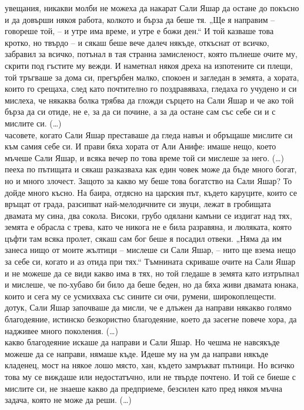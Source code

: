 \documentclass[12pt,a4paper]{article}
\begin{document}
 увещания, никакви молби не можеха да накарат Сали Яшар да остане до покъсно и да довърши някоя работа, колкото и бърза да беше тя. „Ще я направим – говореше
той, – и утре има време, и утре е божи ден.“ И той казваше това кротко, но твърдо – и сякаш
беше вече далеч някъде, откъснат от всичко, забравил за всичко, потънал в тая странна
замисленост, която пълнеше очите му, скрити под гъстите му вежди. И наметнал някоя дреха
на изпотените си плещи, той тръгваше за дома си, прегърбен малко, спокоен и загледан в
земята, а хората, които го срещаха, след като почтително го поздравяваха, гледаха го
учудено и си мислеха, че някаква болка трябва да гложди сърцето на Сали Яшар и че ако той
бърза да си отиде, не е, за да си почине, а за да остане сам със себе си и с мислите си. (…)\\
 часовете, когато Сали Яшар преставаше да гледа навън и обръщаше мислите си
към самия себе си. И прави бяха хората от Али Анифе: имаше нещо, което мъчеше Сали
Яшар, и всяка вечер по това време той си мислеше за него. (…)\\
 пееха по пътищата и сякаш разказваха как един човек може да бъде много
богат, но и много злочест. Защото за какво му беше това богатство на Сали Яшар? То дойде
много късно. На баира, отдясно на царския път, където каруците, които се връщат от града,
разсипват най-мелодичните си звуци, лежат в гробищата двамата му сина, два сокола.
Високи, грубо одялани камъни се издигат над тях, земята е обрасла с трева, като че никога не
е била разравяна, и люляката, която цъфти там всяка пролет, сякаш сам бог беше я посадил
отвеки. „Няма да им занеса нищо от моите жълтици – мислеше си Сали Яшар, – нито ще
взема нещо за себе си, когато и аз отида при тях.“ Тъмнината скриваше очите на Сали Яшар
и не можеше да се види какво има в тях, но той гледаше в земята като изтръпнал и мислеше,
че по-хубаво би било да беше беден, но да бяха живи двамата юнака, които и сега му се
усмихваха със сините си очи, румени, широкоплещести.\\
 дотук, Сали Яшар започваше да мисли, че е длъжен да направи някакво
голямо благодеяние, истинско безкористно благодеяние, което да засегне повече хора, да
надживее много поколения. (…)\\
 какво благодеяние искаше да направи и Сали Яшар. Но чешма не навсякъде
можеше да се направи, нямаше къде. Идеше му на ум да направи някъде кладенец, мост на
някое лошо място, хан, където замръкват пътници. Но всичко това му се виждаше или недостатъчно, или не твърде почтено. И той се биеше с мислите си, не знаеше какво да предприеме, безсилен като пред някоя мъчна задача, която не може да реши. (…)\\
\end{document}
